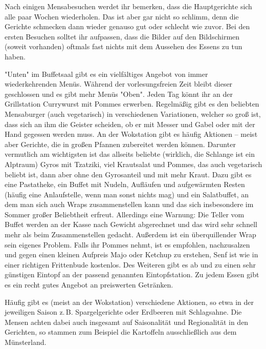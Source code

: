 \begin{multicols}{2}
Nach einigen Mensabesuchen werdet ihr bemerken, dass die Hauptgerichte sich alle paar Wochen wiederholen.
Das ist aber gar nicht so schlimm, denn die Gerichte schmecken dann wieder genauso gut oder schlecht wie zuvor.
Bei den ersten Besuchen solltet ihr aufpassen, dass die Bilder auf den Bildschirmen (soweit vorhanden) oftmals fast nichts mit dem Aussehen des Essens zu tun haben.


"Unten" im Buffetsaal gibt es ein vielfältiges Angebot von immer wiederkehrenden Menüs.
Während der vorlesungsfreien Zeit bleibt dieser geschlossen und es gibt mehr Menüs "Oben".
Jeden Tag könnt ihr an der Grillstation Currywurst mit Pommes erwerben.
Regelmäßig gibt es den beliebten Mensaburger (auch vegetarisch) in verschiedenen Variationen, welcher so groß ist, dass sich an ihm die Geister scheiden, ob er mit Messer und Gabel oder mit der Hand gegessen werden muss.
An der Wokstation gibt es häufig Aktionen – meist aber Gerichte, die in großen Pfannen zubereitet werden können.
Darunter vermutlich am wichtigsten ist das allseits beliebte (wirklich, die Schlange ist ein Alptraum) Gyros mit Tzatziki, viel Krautsalat und Pommes, das auch vegetarisch beliebt ist, dann aber ohne den Gyrosanteil und mit mehr Kraut.
Dazu gibt es eine Pastatheke, ein Buffet mit Nudeln, Aufläufen und aufgewärmten Resten (häufig eine Anlaufstelle, wenn man sonst nichts mag) und ein Salatbuffet, an dem man sich auch Wraps zusammenstellen kann und das sich insbesondere im Sommer großer Beliebtheit erfreut.
Allerdings eine Warnung: Die Teller vom Buffet werden an der Kasse nach Gewicht abgerechnet und das wird sehr schnell mehr als beim Zusammenstellen gedacht.
Außerdem ist ein überquillender Wrap sein eigenes Problem.
Falls ihr Pommes nehmt, ist es empfohlen, nachzusalzen und gegen einen kleinen Aufpreis Majo oder Ketchup zu erstehen, Senf ist wie in einer richtigen Frittenbude kostenlos.
Des Weiteren gibt es ab und zu einen sehr günstigen Eintopf an der passend genannten Eintopfstation.
Zu jedem Essen gibt es ein recht gutes Angebot an preiswerten Getränken.

Häufig gibt es (meist an der Wokstation) verschiedene Aktionen, so etwa in der jeweiligen Saison z.\,B. Spargelgerichte oder Erdbeeren mit Schlagsahne. 
Die Mensen achten dabei auch insgesamt auf Saisonalität und Regionalität in den Gerichten, so stammen zum Beispiel die Kartoffeln ausschließlich aus dem Münsterland.


\end{multicols}
